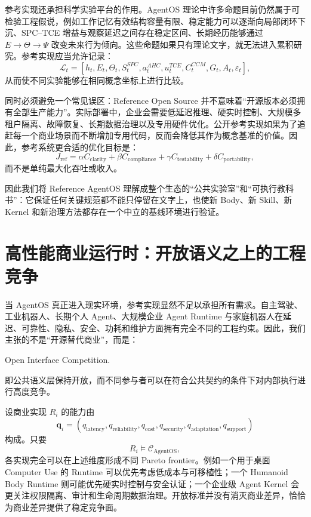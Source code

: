 参考实现还承担科学实验平台的作用。AgentOS 理论中许多命题目前仍然属于可检验工程假说，例如工作记忆有效结构容量有限、稳定能力可以逐渐向局部闭环下沉、SPC--TCE 增益与观察延迟之间存在稳定区间、长期经历能够通过 $E\rightarrow\Theta\rightarrow\Psi$ 改变未来行为倾向。这些命题如果只有理论文字，就无法进入累积研究。参考实现应当允许记录：
\[
\mathcal L_t=
[
h_t,
E_t,
\Theta_t,
S^{SPC}_t,
a^{AHC}_t,
u^{TCE}_t,
C^{CCM}_t,
G_t,
A_t,
\varepsilon_t
],
\]
从而使不同实验能够在相同概念坐标上进行比较。

同时必须避免一个常见误区：Reference Open Source 并不意味着``开源版本必须拥有全部生产能力''。实际部署中，企业会需要低延迟推理、硬实时控制、大规模多租户隔离、故障恢复、长期数据治理以及专用硬件优化。公开参考实现如果为了追赶每一个商业场景而不断增加专用代码，反而会降低其作为概念基准的价值。因此，参考系统更合适的优化目标是：
\[
\boxed{
J_{\mathrm{ref}}
=
\alpha C_{\mathrm{clarity}}
+
\beta C_{\mathrm{compliance}}
+
\gamma C_{\mathrm{testability}}
+
\delta C_{\mathrm{portability}},
}
\]
而不是单纯最大化吞吐或收入。

因此我们将 Reference AgentOS 理解成整个生态的``公共实验室''和``可执行教科书''：它保证任何关键规范都不能只停留在文字上，也使新 Body、新 Skill、新 Kernel 和新治理方法都存在一个中立的基线环境进行验证。

\section{高性能商业运行时：开放语义之上的工程竞争}

当 AgentOS 真正进入现实环境，参考实现显然不足以承担所有需求。自主驾驶、工业机器人、长期个人 Agent、大规模企业 Agent Runtime 与家庭机器人在延迟、可靠性、隐私、安全、功耗和维护方面拥有完全不同的工程约束。因此，我们主张的不是``开源替代商业''，而是：
\begin{statementbox}
Open Interface Competition.
\end{statementbox}
即公共语义层保持开放，而不同参与者可以在符合公共契约的条件下对内部执行进行高度竞争。

设商业实现 $R_i$ 的能力由
\[
\mathbf q_i
=
(q_{\mathrm{latency}},
q_{\mathrm{reliability}},
q_{\mathrm{cost}},
q_{\mathrm{security}},
q_{\mathrm{adaptation}},
q_{\mathrm{support}})
\]
构成。只要
\[
R_i\models\mathcal C_{\mathrm{AgentOS}},
\]
各实现完全可以在上述维度形成不同 Pareto frontier。例如一个用于桌面 Computer Use 的 Runtime 可以优先考虑低成本与可移植性；一个 Humanoid Body Runtime 则可能优先硬实时控制与安全认证；一个企业级 Agent Kernel 会更关注权限隔离、审计和生命周期数据治理。开放标准并没有消灭商业差异，恰恰为商业差异提供了稳定竞争面。

